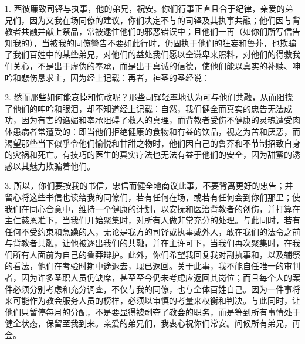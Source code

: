 \par

\par

1. 西彼廉致司铎与执事，他的弟兄，祝安。你们行事正直且合于纪律，亲爱的弟兄们，因为又我在场同僚的建议，你们决定不与的司铎及其执事共融；他们因与背教者共融并献上祭品，常被逮住他们的邪恶错误中；且他们一再（如你们所写信告知我的），当被我的同僚警告不要如此行时，仍固执于他们的狂妄和鲁莽，也欺骗了我们百姓中的某些弟兄，对他们的益处我们愿以全谦卑来照料，对他们的得救我们关心，不是出于虚伪的奉承，而是出于真诚的信德，使他们能以真实的补赎、呻吟和悲伤恳求主，因为经上记载：再者，神圣的圣经说：\par

2. 然而那些如何能哀悼和悔改呢？那些司铎轻率地认为可与他们共融，从而阻挠了他们的呻吟和眼泪，却不知道经上记载：自然，我们健全而真实的忠告无法成功，因为有害的谄媚和奉承阻碍了救人的真理，而背教者受伤不健康的灵魂遭受肉体患病者常遭受的：即当他们拒绝健康的食物和有益的饮品，视之为苦和厌恶，而渴望那些当下似乎令他们愉悦和甘甜之物时，他们因自己的鲁莽和不节制招致自身的灾祸和死亡。有技巧的医生的真实疗法也无法有益于他们的安全，因为甜蜜的诱惑以其魅力欺骗着他们。\par

3. 所以，你们要按我的书信，忠信而健全地商议此事，不要背离更好的忠告；并留心将这些书信也读给我的同僚们，若有任何在场，或若有任何会到你们那里；使我们在同心合意中，维持一个健康的计划，以安抚和医治背教者的创伤，并打算在主仁慈恩准下，当我们开始聚集时，对所有人做非常充分的处理。与此同时，若有任何不受约束和急躁的人，无论是我方的司铎或执事或外人，敢在我们的法令之前与背教者共融，让他被逐出我们的共融，并在主许可下，当我们再次聚集时，在我们所有人面前为自己的鲁莽辩护。此外，你们希望我回复我对副执事和，以及辅祭的看法，他们在考验时期中途退去，现已返回。关于此事，我不能自任唯一的审判者，因为许多圣职人员仍缺席，甚至至今仍未考虑应返回其岗位；而且每个人的案件必须分别考虑和充分调查，不仅与我的同僚，也与全体百姓自己。因为一件事将来可能作为教会服务人员的榜样，必须以审慎的考量来权衡和判决。与此同时，让他们只暂停每月的分配，不是要显得被剥夺了教会的职务，而是等到所有事情处于健全状态，保留至我到来。亲爱的弟兄们，我衷心祝你们常安。问候所有弟兄，再会。\par

